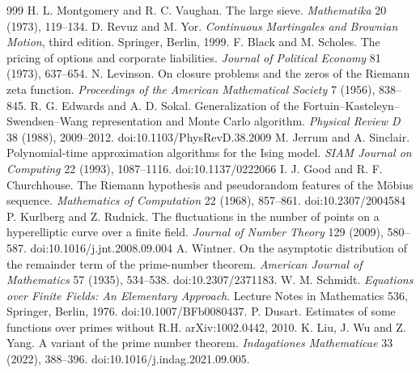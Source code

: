 \begin{thebibliography}{999}
 H. L. Montgomery and R. C. Vaughan. The large sieve. \emph{Mathematika} 20 (1973), 119--134.
 D. Revuz and M. Yor. \emph{Continuous Martingales and Brownian Motion}, third edition. Springer, Berlin, 1999.
 F. Black and M. Scholes. The pricing of options and corporate liabilities. \emph{Journal of Political Economy} 81 (1973), 637--654.
 N. Levinson. On closure problems and the zeros of the Riemann zeta function. \emph{Proceedings of the American Mathematical Society} 7 (1956), 838--845.
 R. G. Edwards and A. D. Sokal. Generalization of the Fortuin--Kasteleyn--Swendsen--Wang representation and Monte Carlo algorithm. \emph{Physical Review D} 38 (1988), 2009--2012. doi:10.1103/PhysRevD.38.2009 %
 M. Jerrum and A. Sinclair. Polynomial-time approximation algorithms for the Ising model. \emph{SIAM Journal on Computing} 22 (1993), 1087--1116. doi:10.1137/0222066 %
 I. J. Good and R. F. Churchhouse. The Riemann hypothesis and pseudorandom features of the M\"obius sequence. \emph{Mathematics of Computation} 22 (1968), 857--861. doi:10.2307/2004584 %
 P. Kurlberg and Z. Rudnick. The fluctuations in the number of points on a hyperelliptic curve over a finite field. \emph{Journal of Number Theory} 129 (2009), 580--587. doi:10.1016/j.jnt.2008.09.004 %
 A. Wintner. On the asymptotic distribution of the remainder term of the prime-number theorem. \emph{American Journal of Mathematics} 57 (1935), 534--538. doi:10.2307/2371183. %
 W. M. Schmidt. \emph{Equations over Finite Fields: An Elementary Approach}. Lecture Notes in Mathematics 536, Springer, Berlin, 1976. doi:10.1007/BFb0080437.
 P. Dusart. Estimates of some functions over primes without R.H. arXiv:1002.0442, 2010.
 K. Liu, J. Wu and Z. Yang. A variant of the prime number theorem. \emph{Indagationes Mathematicae} 33 (2022), 388--396. doi:10.1016/j.indag.2021.09.005.

\end{thebibliography}
